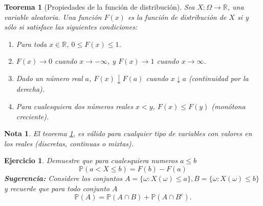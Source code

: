 \documentclass[11pt]{report}
\theoremstyle{break}
\newtheorem{teorema}{Teorema}[chapter]
\newtheorem{nota}{Nota}[chapter]
\newtheorem{ejercicio}{Ejercicio}[chapter]
\theoremstyle{break}
\begin{document}
\begin{teorema}[Propiedades de la función de distribución]
\label{teorema: propiedades de la funcion de distribucion}
Sea $X:\Omega \rightarrow \mathbb{R}$, una variable aleatoria. Una función $F(x)$ es la función de distribución de $X$ si y sólo si satisface las siguientes condiciones:
\begin{enumerate}[label=\alph*)]
\item Para toda $x \in \mathbb{R}$, $0 \leq F(x) \leq 1$.
\item $F(x) \rightarrow 0$ cuando $x \rightarrow -\infty$, y  $F(x) \rightarrow 1$ cuando $x \rightarrow \infty$.
\item Dado un número real $a$, $F(x) \downarrow F(a)$ cuando $x \downarrow a$ (continuidad por la derecha).
\item Para cualesquiera dos números reales $x < y$, $F(x) \leq F(y)$ (monótona creciente).
\end{enumerate}
\end{teorema}
\begin{nota}
El teorema \ref{teorema: propiedades de la funcion de distribucion}, es válido para cualquier tipo de variables con valores en los reales (discretas, continuas o mixtas).
\end{nota}

\begin{ejercicio}
Demuestre que para cualesquiera numeros $a \leq b$
$$
\mathbb{P}(a < X \leq b) = F(b) - F(a)
$$
\textbf{Sugerencia:} Considere los conjuntos $A = \{ \omega: X(\omega) \leq a\}, B = \{\omega: X(\omega) \leq b\}$ y recuerde que para todo conjunto $A$
$$\mathbb{P}(A) = \mathbb{P}(A \cap B) + \mathbb{P}(A \cap B^c).$$
\end{ejercicio}
\end{document}
